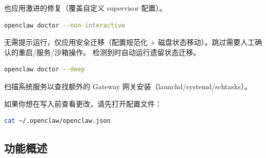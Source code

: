 也应用激进的修复（覆盖自定义 supervisor 配置）。

\begin{lstlisting}[language=bash]
openclaw doctor --non-interactive
\end{lstlisting}


无需提示运行，仅应用安全迁移（配置规范化 + 磁盘状态移动）。跳过需要人工确认的重启/服务/沙箱操作。
检测到时自动运行遗留状态迁移。

\begin{lstlisting}[language=bash]
openclaw doctor --deep
\end{lstlisting}


扫描系统服务以查找额外的 Gateway 网关安装（launchd/systemd/schtasks）。

如果你想在写入前查看更改，请先打开配置文件：

\begin{lstlisting}[language=bash]
cat ~/.openclaw/openclaw.json
\end{lstlisting}


\subsection{功能概述}


